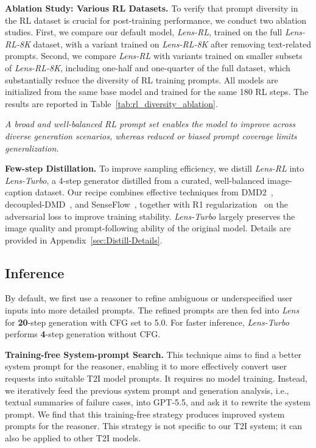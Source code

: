 \noindent\textbf{Ablation Study: Various RL Datasets.} To verify that prompt diversity in the RL dataset is crucial for post-training performance, we conduct two ablation studies. First, we compare our default model, \textit{Lens-RL}, trained on the full \textit{Lens-RL-8K} dataset, with a variant trained on \textit{Lens-RL-8K} after removing text-related prompts. Second, we compare \textit{Lens-RL} with variants trained on smaller subsets of \textit{Lens-RL-8K}, including one-half and one-quarter of the full dataset, which substantially reduce the diversity of RL training prompts. All models are initialized from the same base model and trained for the same 180 RL steps. The results are reported in Table~\ref{tab:rl_diversity_ablation}.


\begin{tcolorbox}[colback=gray!5,colframe=black]
\textit{A broad and well-balanced RL prompt set enables the model to improve across diverse generation scenarios, whereas reduced or biased prompt coverage limits generalization.}
\end{tcolorbox}

\noindent\textbf{Few-step Distillation.} To improve sampling efficiency, we distill \textit{Lens-RL} into \textit{Lens-Turbo}, a 4-step generator distilled from a curated, well-balanced image-caption dataset. Our recipe combines effective techniques from DMD2~\citep{dmd2}, decoupled-DMD~\citep{decoupleddmd}, and SenseFlow~\citep{senseflow}, together with R1 regularization~\citep{R1penalty, apt} on the adversarial loss to improve training stability. \textit{Lens-Turbo} largely preserves the image quality and prompt-following ability of the original model. Details are provided in Appendix~\ref{sec:Distill-Details}.




\subsection{Inference}
\label{sec:optimization}



By default, we first use a reasoner to refine ambiguous or underspecified user inputs into more detailed prompts. The refined prompts are then fed into \textit{Lens} for \textbf{20}-step generation with CFG set to 5.0. For faster inference, \textit{Lens-Turbo} performs \textbf{4}-step generation without CFG.


\noindent\textbf{Training-free System-prompt Search.}
This technique aims to find a better system prompt for the reasoner, enabling it to more effectively convert user requests into suitable T2I model prompts. It requires no model training. Instead, we iteratively feed the previous system prompt and generation analysis, i.e., textual summaries of failure cases, into GPT-5.5, and ask it to rewrite the system prompt. We find that this training-free strategy produces improved system prompts for the reasoner. This strategy is not specific to our T2I system; it can also be applied to other T2I models.

